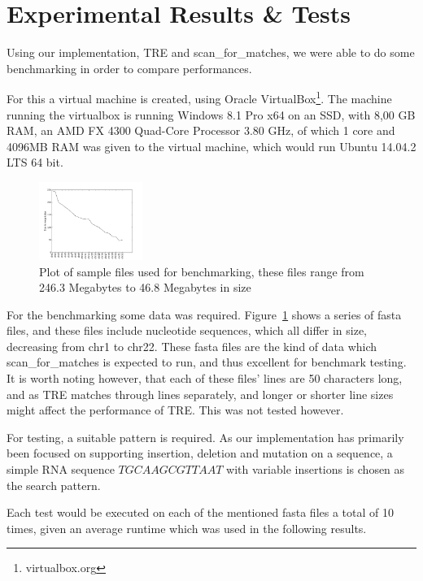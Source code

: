 \section{Experimental Results \& Tests}
Using our implementation, TRE and scan\_for\_matches, we were able to do some benchmarking in order to compare performances.

For this a virtual machine is created, using Oracle VirtualBox\footnote{virtualbox.org}. The machine running the virtualbox is running Windows 8.1 Pro x64 on an SSD, with 8,00 GB RAM, an AMD FX 4300 Quad-Core Processor 3.80 GHz, of which 1 core and 4096MB RAM was given to the virtual machine, which would run Ubuntu 14.04.2 LTS 64 bit.

\begin{figure}
\centering
\includegraphics[width=0.3\textwidth]{Benchmarking/size.png}
\caption{Plot of sample files used for benchmarking, these files range from 246.3 Megabytes to 46.8 Megabytes in size}
\label{fig:size}
\end{figure}

For the benchmarking some data was required. Figure~\ref{fig:size} shows a series of fasta files, and these files include nucleotide sequences, which all differ in size, decreasing from chr1 to chr22. These fasta files are the  kind of data which scan\_for\_matches is expected to run, and thus excellent for benchmark testing. It is worth noting however, that each of these files' lines are 50 characters long, and as TRE matches through lines separately, and longer or shorter line sizes might affect the performance of TRE. This was not tested however.

For testing, a suitable pattern is required. As our implementation has primarily been focused on supporting insertion, deletion and mutation on a sequence, a simple RNA sequence $TGCAAGCGTTAAT$ with variable insertions is chosen as the search pattern.

Each test would be executed on each of the mentioned fasta files a total of 10 times, given an average runtime which was used in the following results.

